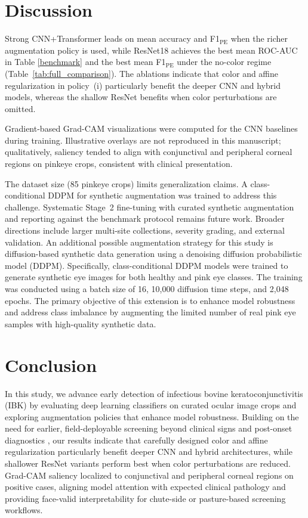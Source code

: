\documentclass[preprint,12pt,authoryear]{elsarticle}
\begin{document}


\section{Discussion}
\label{discussion}

Strong CNN+Transformer leads on mean accuracy and F1$_{\mathrm{PE}}$ when the richer augmentation policy is used, while ResNet18 achieves the best mean ROC-AUC in Table \ref{benchmark} and the best mean F1$_{\mathrm{PE}}$ under the no-color regime (Table~\ref{tab:full_comparison}). The ablations indicate that color and affine regularization in policy~(i) particularly benefit the deeper CNN and hybrid models, whereas the shallow ResNet benefits when color perturbations are omitted.

Gradient-based Grad-CAM visualizations \cite{selvaraju2017gradcam} were computed for the CNN baselines during training. Illustrative overlays are not reproduced in this manuscript; qualitatively, saliency tended to align with conjunctival and peripheral corneal regions on pinkeye crops, consistent with clinical presentation.

The dataset size (85 pinkeye crops) limits generalization claims. A class-conditional DDPM \citep{ho2020ddpm} for synthetic augmentation was trained to address this challenge. Systematic Stage~2 fine-tuning with curated synthetic augmentation and reporting against the benchmark protocol remains future work. Broader directions include larger multi-site collections, severity grading, and external validation. An additional possible augmentation strategy for this study is diffusion-based synthetic data generation using a denoising diffusion probabilistic model (DDPM). Specifically, class-conditional DDPM models were trained to generate synthetic eye images for both healthy and pink eye classes. The training was conducted using a batch size of 16, 10,000 diffusion time steps, and 2,048 epochs. The primary objective of this extension is to enhance model robustness and address class imbalance by augmenting the limited number of real pink eye samples with high-quality synthetic data.

\section{Conclusion}
In this study, we advance early detection of infectious bovine keratoconjunctivitis (IBK) by evaluating deep learning classifiers on curated ocular image crops and exploring augmentation policies that enhance model robustness. Building on the need for earlier, field-deployable screening beyond clinical signs and post-onset diagnostics \citep{brown1998, angelos2015}, our results indicate that carefully designed color and affine regularization particularly benefit deeper CNN and hybrid architectures, while shallower ResNet variants perform best when color perturbations are reduced. Grad-CAM saliency localized to conjunctival and peripheral corneal regions on positive cases, aligning model attention with expected clinical pathology and providing face-valid interpretability for chute-side or pasture-based screening workflows.
\end{document}

